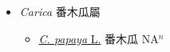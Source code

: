 
  \begin{itemize}
 \item[] \textit{Carica} 番木瓜屬
                    
  \begin{itemize}
        \item[] \href{http://www.theplantlist.org/tpl1.1/search?q=Carica+papaya}{\textit{C. papaya} L.}   番木瓜 NA$^n$
  \end{itemize}
  \end{itemize}
